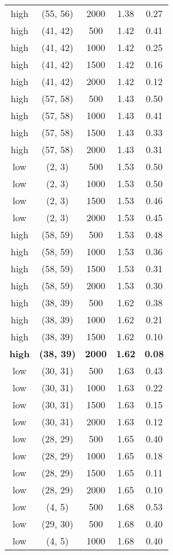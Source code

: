 \begin{tabular}{c c c c c}
high & (55, 56) &  2000 & 1.38 & 0.27 \\
high & (41, 42) &  500 & 1.42 & 0.41 \\
high & (41, 42) &  1000 & 1.42 & 0.25 \\
high & (41, 42) &  1500 & 1.42 & 0.16 \\
high & (41, 42) &  2000 & 1.42 & 0.12 \\
high & (57, 58) &  500 & 1.43 & 0.50 \\
high & (57, 58) &  1000 & 1.43 & 0.41 \\
high & (57, 58) &  1500 & 1.43 & 0.33 \\
high & (57, 58) &  2000 & 1.43 & 0.31 \\
low & (2, 3) &  500 & 1.53 & 0.50 \\
low & (2, 3) &  1000 & 1.53 & 0.50 \\
low & (2, 3) &  1500 & 1.53 & 0.46 \\
low & (2, 3) &  2000 & 1.53 & 0.45 \\
high & (58, 59) &  500 & 1.53 & 0.48 \\
high & (58, 59) &  1000 & 1.53 & 0.36 \\
high & (58, 59) &  1500 & 1.53 & 0.31 \\
high & (58, 59) &  2000 & 1.53 & 0.30 \\
high & (38, 39) &  500 & 1.62 & 0.38 \\
high & (38, 39) &  1000 & 1.62 & 0.21 \\
high & (38, 39) &  1500 & 1.62 & 0.10 \\
\textbf{high} & \textbf{(38, 39)} & \textbf{ 2000} & \textbf{1.62} & \textbf{0.08} \\
low & (30, 31) &  500 & 1.63 & 0.43 \\
low & (30, 31) &  1000 & 1.63 & 0.22 \\
low & (30, 31) &  1500 & 1.63 & 0.15 \\
low & (30, 31) &  2000 & 1.63 & 0.12 \\
low & (28, 29) &  500 & 1.65 & 0.40 \\
low & (28, 29) &  1000 & 1.65 & 0.18 \\
low & (28, 29) &  1500 & 1.65 & 0.11 \\
low & (28, 29) &  2000 & 1.65 & 0.10 \\
low & (4, 5) &  500 & 1.68 & 0.53 \\
low & (29, 30) &  500 & 1.68 & 0.40 \\
low & (4, 5) &  1000 & 1.68 & 0.40 \\

\end{tabular}
